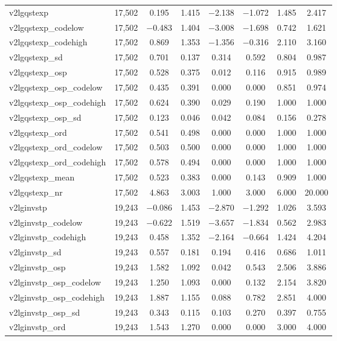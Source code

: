 \begin{table}[!htbp]
\begin{tabular}{@{\extracolsep{5pt}}lccccccc}
v2lgqstexp & 17,502 & 0.195 & 1.415 & $-$2.138 & $-$1.072 & 1.485 & 2.417 \\ 
v2lgqstexp\_codelow & 17,502 & $-$0.483 & 1.404 & $-$3.008 & $-$1.698 & 0.742 & 1.621 \\ 
v2lgqstexp\_codehigh & 17,502 & 0.869 & 1.353 & $-$1.356 & $-$0.316 & 2.110 & 3.160 \\ 
v2lgqstexp\_sd & 17,502 & 0.701 & 0.137 & 0.314 & 0.592 & 0.804 & 0.987 \\ 
v2lgqstexp\_osp & 17,502 & 0.528 & 0.375 & 0.012 & 0.116 & 0.915 & 0.989 \\ 
v2lgqstexp\_osp\_codelow & 17,502 & 0.435 & 0.391 & 0.000 & 0.000 & 0.851 & 0.974 \\ 
v2lgqstexp\_osp\_codehigh & 17,502 & 0.624 & 0.390 & 0.029 & 0.190 & 1.000 & 1.000 \\ 
v2lgqstexp\_osp\_sd & 17,502 & 0.123 & 0.046 & 0.042 & 0.084 & 0.156 & 0.278 \\ 
v2lgqstexp\_ord & 17,502 & 0.541 & 0.498 & 0.000 & 0.000 & 1.000 & 1.000 \\ 
v2lgqstexp\_ord\_codelow & 17,502 & 0.503 & 0.500 & 0.000 & 0.000 & 1.000 & 1.000 \\ 
v2lgqstexp\_ord\_codehigh & 17,502 & 0.578 & 0.494 & 0.000 & 0.000 & 1.000 & 1.000 \\ 
v2lgqstexp\_mean & 17,502 & 0.523 & 0.383 & 0.000 & 0.143 & 0.909 & 1.000 \\ 
v2lgqstexp\_nr & 17,502 & 4.863 & 3.003 & 1.000 & 3.000 & 6.000 & 20.000 \\ 
v2lginvstp & 19,243 & $-$0.086 & 1.453 & $-$2.870 & $-$1.292 & 1.026 & 3.593 \\ 
v2lginvstp\_codelow & 19,243 & $-$0.622 & 1.519 & $-$3.657 & $-$1.834 & 0.562 & 2.983 \\ 
v2lginvstp\_codehigh & 19,243 & 0.458 & 1.352 & $-$2.164 & $-$0.664 & 1.424 & 4.204 \\ 
v2lginvstp\_sd & 19,243 & 0.557 & 0.181 & 0.194 & 0.416 & 0.686 & 1.011 \\ 
v2lginvstp\_osp & 19,243 & 1.582 & 1.092 & 0.042 & 0.543 & 2.506 & 3.886 \\ 
v2lginvstp\_osp\_codelow & 19,243 & 1.250 & 1.093 & 0.000 & 0.132 & 2.154 & 3.820 \\ 
v2lginvstp\_osp\_codehigh & 19,243 & 1.887 & 1.155 & 0.088 & 0.782 & 2.851 & 4.000 \\ 
v2lginvstp\_osp\_sd & 19,243 & 0.343 & 0.115 & 0.103 & 0.270 & 0.397 & 0.755 \\ 
v2lginvstp\_ord & 19,243 & 1.543 & 1.270 & 0.000 & 0.000 & 3.000 & 4.000 \\ 

\end{tabular}
\end{table}

